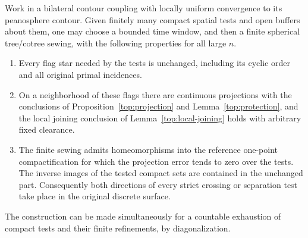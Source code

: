 \begin{proposition}
\label{top:protected-window}
Work in a bilateral contour coupling with locally uniform convergence
to its peanosphere contour.  Given finitely many compact spatial
tests and open buffers about them, one may choose a bounded time
window, and then a finite spherical tree/cotree sewing, with the
following properties for all large $n$.
\begin{enumerate}[label=(\roman*)]
\item Every flag star needed by the tests is unchanged, including its
cyclic order and all original primal incidences.
\item On a neighborhood of these flags there are continuous projections
with the conclusions of Proposition~\ref{top:projection} and
Lemma~\ref{top:protection}, and the local joining conclusion of
Lemma~\ref{top:local-joining} holds with arbitrary fixed clearance.
\item The finite sewing admits homeomorphisms into the reference
one-point compactification for which the projection error tends to
zero over the tests.  The inverse images of the tested compact sets
are contained in the unchanged part.  Consequently both directions
of every strict crossing or separation test take place in the
original discrete surface.
\end{enumerate}
The construction can be made simultaneously for a countable exhaustion
of compact tests and their finite refinements, by diagonalization.
\end{proposition}

